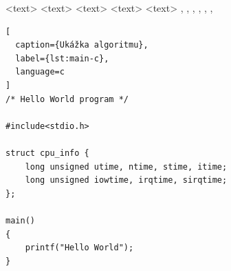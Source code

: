 \begin{algorithm}
\scriptsize
\begin{algorithmic}
 \STATE <text>
   \ELSE {} \ENDIF
     \ENDIF
   \ENDFOR
   \ENDFOR
   \ENDFOR
   \ENDWHILE
 \REPEAT {} 
 \LOOP {} \ENDLOOP
 \REQUIRE <text>
 \ENSURE <text>
 \RETURN <text>
 \PRINT <text>
 \AND, \OR, \XOR, \NOT, \TO, \TRUE, \FALSE
\end{algorithmic}
\caption{Ukážka príkazov pre algorithmic}  
\label{alg:preview}  
\end{algorithm}

\begin{lstlisting}[
  caption={Ukážka algoritmu},
  label={lst:main-c},
  language=c
]
/* Hello World program */

#include<stdio.h>

struct cpu_info {
    long unsigned utime, ntime, stime, itime;
    long unsigned iowtime, irqtime, sirqtime;
};

main()
{
    printf("Hello World");
}
\end{lstlisting}